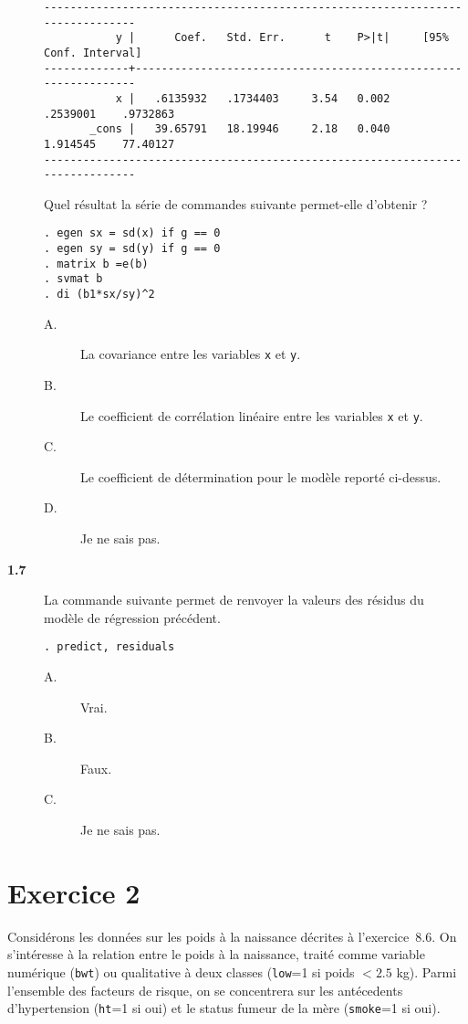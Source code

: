 \begin{description}
\begin{verbatim}
------------------------------------------------------------------------------
           y |      Coef.   Std. Err.      t    P>|t|     [95% Conf. Interval]
-------------+----------------------------------------------------------------
           x |   .6135932   .1734403     3.54   0.002     .2539001    .9732863
       _cons |   39.65791   18.19946     2.18   0.040     1.914545    77.40127
------------------------------------------------------------------------------
\end{verbatim}
Quel résultat la série de commandes suivante permet-elle d'obtenir ?
\begin{verbatim}
. egen sx = sd(x) if g == 0
. egen sy = sd(y) if g == 0
. matrix b =e(b)
. svmat b
. di (b1*sx/sy)^2
\end{verbatim}
\begin{description}
\item[A.] La covariance entre les variables \texttt{x} et \texttt{y}.
\item[B.] Le coefficient de corrélation linéaire entre les variables
  \texttt{x} et \texttt{y}.
\item[C.] Le coefficient de détermination pour le modèle reporté ci-dessus. 
\item[D.] Je ne sais pas.
\end{description}
\item[\bf 1.7] La commande suivante permet de renvoyer la valeurs des
  résidus du modèle de régression précédent. 
\begin{verbatim}
. predict, residuals
\end{verbatim}
\begin{description}
\item[A.] Vrai.
\item[B.] Faux.
\item[C.] Je ne sais pas.
\end{description}
\end{description}

\section*{Exercice 2}
Considérons les données sur les poids à la naissance décrites à
l'exercice~8.6. On s'intéresse à la relation entre le poids à la naissance,
traité comme variable numérique (\texttt{bwt}) ou qualitative à deux classes
(\texttt{low}=1 si poids $<2.5$ kg). Parmi l'ensemble des facteurs de
risque, on se concentrera sur les antécedents d'hypertension (\texttt{ht}=1
si oui) et le status fumeur de la mère (\texttt{smoke}=1 si oui).


